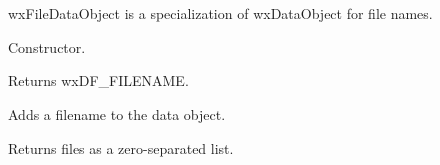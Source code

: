 \section{}\label{wxfiledataobject}

wxFileDataObject is a specialization of wxDataObject for file names.






\label{wxfiledataobjectwxfiledataobject}


Constructor.

\label{wxfiledataobjectgetformat}


Returns wxDF\_FILENAME.

\label{wxfiledataobjectaddfile}


Adds a filename to the data object.

\label{wxfiledataobjectgetfiles}


Returns files as a zero-separated list.

